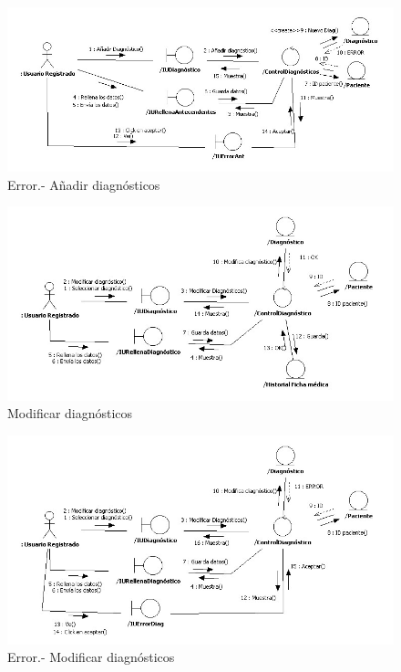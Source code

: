 		\begin{figure}[H]
		  \centering
		    \includegraphics[width=16cm]{img/jpg/colaboraciones/39_AnadirDiagnosticoError.jpg}
		  \caption{Error.- Añadir diagnósticos}
		  \label{fig:col_diag_fm_anadir_err}
		\end{figure}
		
		\begin{figure}[H]
		  \centering
		    \includegraphics[width=16cm]{img/jpg/colaboraciones/40_ModificarDiagnostico.jpg}
		  \caption{Modificar diagnósticos}
		  \label{fig:col_diag_fm_modificar}
		\end{figure}
		
		\begin{figure}[H]
		  \centering
		    \includegraphics[width=16cm]{img/jpg/colaboraciones/41_ModificarDiagnosticoError.jpg}
		  \caption{Error.- Modificar diagnósticos}
		  \label{fig:col_diag_fm_modificar_error}
		\end{figure}
		
